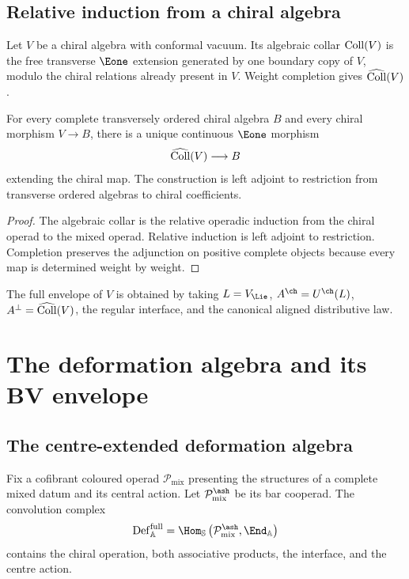 \chapter{Relative induction from a chiral algebra}
Let $V$ be a chiral algebra with conformal vacuum.  Its algebraic collar $\operatorname{Coll}(V)$ is the free transverse $\Eone$ extension generated by one boundary copy of $V$, modulo the chiral relations already present in $V$.  Weight completion gives $\widehat{\operatorname{Coll}}(V)$.

\begin{theorem}
For every complete transversely ordered chiral algebra $B$ and every chiral morphism $V\to B$, there is a unique continuous $\Eone$ morphism
\[
 \widehat{\operatorname{Coll}}(V)\longrightarrow B
\]
extending the chiral map.  The construction is left adjoint to restriction from transverse ordered algebras to chiral coefficients.
\end{theorem}
\begin{proof}
The algebraic collar is the relative operadic induction from the chiral operad to the mixed operad.  Relative induction is left adjoint to restriction.  Completion preserves the adjunction on positive complete objects because every map is determined weight by weight.
\end{proof}

The full envelope of $V$ is obtained by taking $L=V_{\Lie}$, $A^{\ch}=U^{\ch}(L)$, $A^\perp=\widehat{\operatorname{Coll}}(V)$, the regular interface, and the canonical aligned distributive law.

\part{The deformation algebra and its BV envelope}

\chapter{The centre-extended deformation algebra}
Fix a cofibrant coloured operad $\mathcal P_{\mathrm{mix}}$ presenting the structures of a complete mixed datum and its central action.  Let $\mathcal P_{\mathrm{mix}}^{\ash}$ be its bar cooperad.  The convolution complex
\[
 \Def_{\mathbb A}^{\mathrm{full}}
 =\Hom_{\mathbb S}
 \left(\mathcal P_{\mathrm{mix}}^{\ash},\End_{\mathbb A}\right)
\]
contains the chiral operation, both associative products, the interface, and the centre action.


